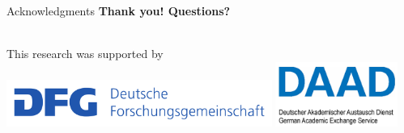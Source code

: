 \documentclass[usenames,dvipsnames]{beamer}
\begin{document}
\begin{frame}{ Acknowledgments }
\Huge{\textbf{Thank you! \alert{Questions?}}}

\\ 

{\normalsize This research was supported by}
\includegraphics[width=0.65\textwidth]{dfg} \includegraphics[width=0.3\textwidth]{daad}

\end{frame}
%
%
%
%
%
%			
\end{document}

